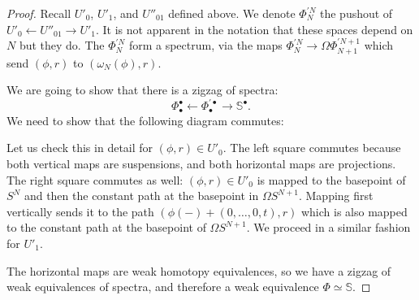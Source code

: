 \documentclass[12pt]{amsart}
\theoremstyle{plain}
\theoremstyle{definition}
\theoremstyle{remark}
\begin{document}
\begin{proof}
    Recall $U'_0$, $U'_1$, and $U''_{01}$ defined above. We denote $\Phi_N^{'N}$ the pushout of $U'_0\leftarrow U''_{01}\rightarrow U'_1$.
    It is not apparent in the notation that these spaces depend on $N$ but they do.
    The $\Phi_N^{'N}$ form a spectrum, via the maps $\Phi_{N}^{'N}\rightarrow \Omega\Phi_{N+1}^{'N+1}$ which send $(\phi,r)$ to $(\omega_N(\phi),r)$. 

    We are going to show that there is a zigzag of spectra:
    \[\Phi_\bullet^\bullet \leftarrow \Phi_\bullet^{'\bullet} \rightarrow \mathbb{S}^\bullet.\]
    We need to show that the following diagram commutes:
    \begin{center}
    \end{center}
    
    Let us check this in detail for $(\phi,r)\in U'_0$.
    The left square commutes because both vertical maps are suspensions, and both horizontal maps are projections.
    The right square commutes as well: $(\phi,r)\in U'_0$ is mapped to the basepoint of $S^N$ and then the constant path at the basepoint in $\Omega S^{N+1}$.
    Mapping first vertically sends it to the path $(\phi(-)+(0,\dots,0,t),r)$ which is also mapped to the constant path at the basepoint of $\Omega S^{N+1}$.
    We proceed in a similar fashion for $U'_1$. 

    The horizontal maps are weak homotopy equivalences, so we have a zigzag of weak equivalences of spectra, and therefore a weak equivalence $\Phi \simeq \mathbb{S}$.
\end{proof}


\end{document}
